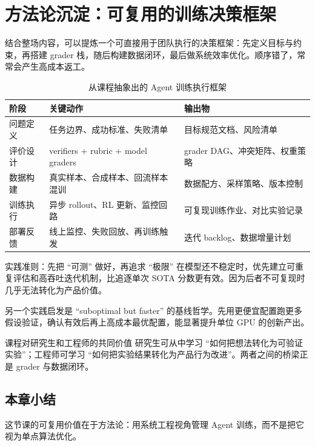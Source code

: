 \section{方法论沉淀：可复用的训练决策框架}

结合整场内容，可以提炼一个可直接用于团队执行的决策框架：先定义目标与约束，再搭建 grader 栈，随后构建数据闭环，最后做系统效率优化。顺序错了，常常会产生高成本返工。

\begin{table}[H]
\centering
\begin{tabular}{p{2.0cm}p{4.2cm}p{4.6cm}}
\toprule
\textbf{阶段} & \textbf{关键动作} & \textbf{输出物} \\
\midrule
问题定义 & 任务边界、成功标准、失败清单 & 目标规范文档、风险清单 \\
评价设计 & verifiers + rubric + model graders & grader DAG、冲突矩阵、权重策略 \\
数据构建 & 真实样本、合成样本、回流样本混训 & 数据配方、采样策略、版本控制 \\
训练执行 & 异步 rollout、RL 更新、监控回路 & 可复现训练作业、对比实验记录 \\
部署反馈 & 线上监控、失败回放、再训练触发 & 迭代 backlog、数据增量计划 \\
\bottomrule
\end{tabular}
\caption{从课程抽象出的 Agent 训练执行框架}
\end{table}

\begin{importantbox}{实践准则：先把 ``可测'' 做好，再追求 ``极限''}
在模型还不稳定时，优先建立可重复评估和高吞吐迭代机制，比追逐单次 SOTA 分数更有效。因为后者不可复现时几乎无法转化为产品价值。
\end{importantbox}

另一个实践启发是 ``suboptimal but faster'' 的基线哲学。先用更便宜配置跑更多假设验证，确认有效后再上高成本最优配置，能显著提升单位 GPU 的创新产出。

\begin{knowledgebox}{课程对研究生和工程师的共同价值}
研究生可从中学习 ``如何把想法转化为可验证实验''；工程师可学习 ``如何把实验结果转化为产品行为改进''。两者之间的桥梁正是 grader 与数据闭环。
\end{knowledgebox}

\subsection{本章小结}
这节课的可复用价值在于方法论：用系统工程视角管理 Agent 训练，而不是把它视为单点算法优化。

